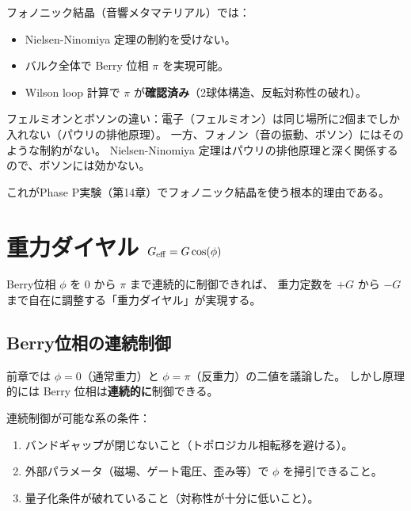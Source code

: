 \begin{keyresult}[ボソン系のBerry位相 $\pi$]
フォノニック結晶（音響メタマテリアル）では：
\begin{itemize}
  \item Nielsen-Ninomiya 定理の制約を受けない。
  \item バルク全体で Berry 位相 $\pi$ を実現可能。
  \item Wilson loop 計算で $\pi$ が\textbf{確認済み}（2球体構造、反転対称性の破れ）。
\end{itemize}
\end{keyresult}

\begin{hsbox}
フェルミオンとボソンの違い：電子（フェルミオン）は同じ場所に2個までしか入れない（パウリの排他原理）。
一方、フォノン（音の振動、ボソン）にはそのような制約がない。
Nielsen-Ninomiya 定理はパウリの排他原理と深く関係するので、ボソンには効かない。
\end{hsbox}

これがPhase P実験（第14章）でフォノニック結晶を使う根本的理由である。


\chapter{重力ダイヤル $G_{\mathrm{eff}} = G\cos(\phi)$}
\label{ch:gravity-dial}

\begin{keyresult}[本章の主題]
Berry位相 $\phi$ を $0$ から $\pi$ まで連続的に制御できれば、
重力定数を $+G$ から $-G$ まで自在に調整する「重力ダイヤル」が実現する。
\end{keyresult}

\section{Berry位相の連続制御}
\label{sec:12.1}

前章では $\phi = 0$（通常重力）と $\phi = \pi$（反重力）の二値を議論した。
しかし原理的には Berry 位相は\textbf{連続的に}制御できる。

連続制御が可能な系の条件：
\begin{enumerate}[label=(\roman*)]
  \item バンドギャップが閉じないこと（トポロジカル相転移を避ける）。
  \item 外部パラメータ（磁場、ゲート電圧、歪み等）で $\phi$ を掃引できること。
  \item 量子化条件が破れていること（対称性が十分に低いこと）。
\end{enumerate}

